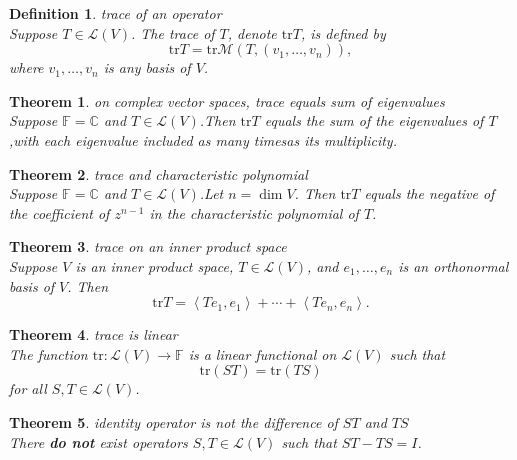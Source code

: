 \documentclass{article}
\newtheorem{theorem}{Theorem}[subsection]
\newtheorem{definition}{Definition}[subsection]
\newcommand{\CC}{\mathbb{C}}
\newcommand{\FF}{\mathbb{F}}
\newcommand{\tr}{\text{tr}}
\begin{document}
\begin{CJK}{UTF8}{gkai}
\begin{definition}
    trace of an operator\\

    Suppose $T \in \mathcal{L}(V)$. The trace of $T$, denote $\tr T$, is defined by
    \[\tr T = \tr\mathcal{M}(T,(v_1,\ldots,v_n)),\]
    where $v_1,\ldots,v_n$ is any basis of $V$.
\end{definition}

\begin{theorem}
    on complex vector spaces, trace equals sum of eigenvalues\\

    Suppose $\FF = \CC$ and $T\in\mathcal{L}(V)$.Then $\tr T$ equals the sum of the eigenvalues of $T$,with each eigenvalue included as many timesas its multiplicity.
\end{theorem}

\begin{theorem}
    trace and characteristic polynomial\\

    Suppose $\FF =\CC$ and $T\in\mathcal{L}(V)$.Let $n=\dim V$. Then $\tr T$ equals the negative of the coefficient of $z^{n-1}$ in the characteristic polynomial of $T$.

\end{theorem}

\begin{theorem}
    trace on an inner product space\\
    
    Suppose $V$ is an inner product space, $T \in \mathcal{L}(V)$, and $e_1,\ldots,e_n$ is an orthonormal basis of $V$. Then
    \[\tr T = \left<Te_1,e_1\right> + \cdots+\left<Te_n,e_n\right>.\]
\end{theorem}

\begin{theorem}
    trace is linear\\

    The function $\tr : \mathcal{L}(V) \to \FF$ is a linear functional on $\mathcal{L}(V)$ such that
    \[\tr(ST) = \tr(TS)\]
    for all $S,T \in \mathcal{L}(V)$.
\end{theorem}

\begin{theorem}
    identity operator is not the difference of $ST$ and $TS$\\

    There \textbf{do not} exist operators $S, T\in\mathcal{L}(V)$ such that $ST-TS=I$.
\end{theorem}


\end{CJK}
\end{document}
